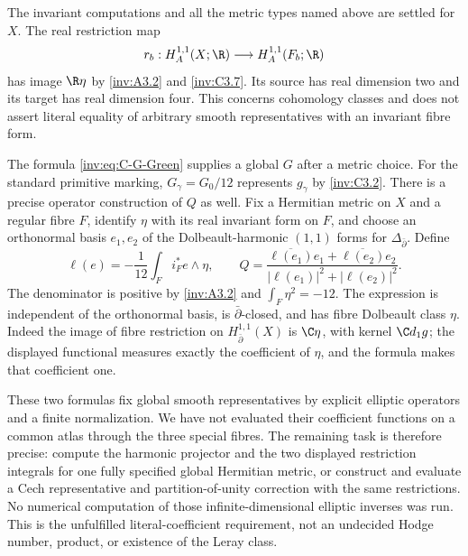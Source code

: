 \begin{question}\label{inv:C3.8}
The invariant computations and all the metric types named above are
settled for $X$.  The real restriction map
\[
r_b:H_A^{1,1}(X;\R)\longrightarrow H_A^{1,1}(F_b;\R)
\]
has image $\R\eta$ by \ref{inv:A3.2} and \ref{inv:C3.7}.  Its source has real dimension
two and its target has real dimension four.  This concerns
cohomology classes and does not assert literal equality of arbitrary
smooth representatives with an invariant fibre form.

The formula \eqref{inv:eq:C-G-Green} supplies a global $G$ after a metric
choice.  For the standard primitive marking, $G_\gamma=G_0/12$
represents $g_\gamma$ by \ref{inv:C3.2}.  There is a precise operator
construction of $Q$ as well.  Fix a Hermitian metric on $X$ and a
regular fibre $F$, identify $\eta$ with its real invariant form on
$F$, and choose an orthonormal basis $e_1,e_2$ of the Dolbeault-harmonic
$(1,1)$ forms for $\Delta_{\bar\partial}$.  Define
\[
\ell(e)=-\frac1{12}\int_F i_F^*e\wedge\eta,\qquad
Q=\frac{\overline{\ell(e_1)}e_1+
            \overline{\ell(e_2)}e_2}
          {|\ell(e_1)|^2+|\ell(e_2)|^2}.
\]
The denominator is positive by \ref{inv:A3.2} and
$\int_F\eta^2=-12$.  The expression is independent of the
orthonormal basis, is $\bar\partial$-closed, and has fibre
Dolbeault class $\eta$.  Indeed the image of fibre restriction on
$H^{1,1}_{\bar\partial}(X)$ is $\C\eta$, with kernel
$\C d_1g$; the displayed functional measures exactly the coefficient
of $\eta$, and the formula makes that coefficient one.

These two formulas fix global smooth representatives by explicit
elliptic operators and a finite normalization.  We have not evaluated
their coefficient functions on a common atlas through the three
special fibres.  The remaining task is therefore precise: compute
the harmonic projector and the two displayed restriction integrals
for one fully specified global Hermitian metric, or construct and
evaluate a Cech representative and partition-of-unity correction
with the same restrictions.  No numerical computation of those
infinite-dimensional elliptic inverses was run.  This is the
unfulfilled literal-coefficient requirement, not an undecided Hodge
number, product, or existence of the Leray class.
\end{question}

